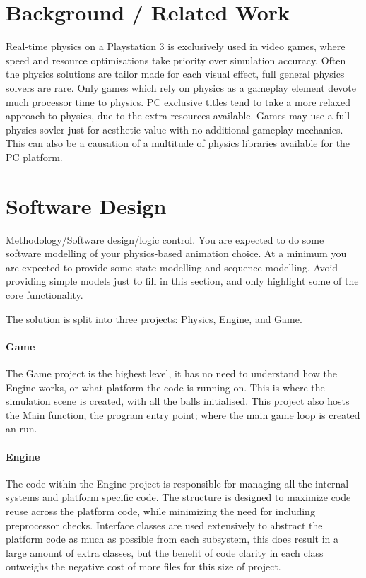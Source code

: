\documentclass[conference]{acmsiggraph}
\begin{document}
\section{Background / Related Work}
Real-time physics on a Playstation 3 is exclusively used in video games, where speed and resource optimisations take priority over simulation accuracy. Often the physics solutions are tailor made for each visual effect, full general physics solvers are rare. Only games which rely on physics as a gameplay element devote much processor time to physics.
PC exclusive titles tend to take a more relaxed approach to physics, due to the extra resources available. Games may use a full physics sovler just for aesthetic value with no additional gameplay mechanics. This can also be a causation of a multitude of physics libraries available for the PC platform.


\section{Software Design}
Methodology/Software design/logic control. You are expected to do some software
modelling of your physics-based animation choice. At a minimum you are expected to
provide some state modelling and sequence modelling. Avoid providing simple models just
to fill in this section, and only highlight some of the core functionality.

The solution is split into three projects: Physics, Engine, and Game.
\paragraph{Game}
The Game project is the highest level, it has no need to understand how the Engine works, or what platform the code is running on. This is where the simulation scene is created, with all the balls initialised. This project also hosts the Main function, the program entry point; where the main game loop is created an run.

\paragraph{Engine}
The code within the Engine project is responsible for managing all the internal systems and platform specific code. The structure is designed to maximize code reuse across the platform code, while minimizing the need for including preprocessor checks. Interface classes are used extensively to abstract the platform code as much as possible from each subsystem, this does result in a large amount of extra classes, but the benefit of code clarity in each class outweighs the negative cost of more files for this size of project.
\end{document}
